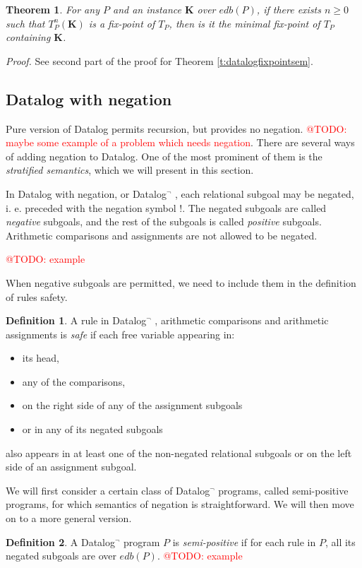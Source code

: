 \documentclass{pracamgr}
\makeatletter
\theoremstyle{plain}
\newtheorem{thm}{Theorem}[section]
\theoremstyle{definition}
\newtheorem{defn}{Definition}[section]
\theoremstyle{remark}
\newcommand{\todo}[1]{\textcolor{red}{@TODO: #1}}
\newcommand{\datalogneg}{Datalog$^{\neg}$ }
\makeatother
\begin{document}
\begin{thm}
For any $P$ and an instance $\textbf{K}$ over $edb(P)$, if there exists $n \ge 0$ such that $T_P^n(\textbf{K})$ is a fix-point of $T_P$, then is it the minimal fix-point of $T_P$ containing $\textbf{K}$.
\end{thm}
\emph{Proof.} See second part of the proof for Theorem \ref{t:datalogfixpointsem}.

\subsection{Datalog with negation}
Pure version of Datalog permits recursion, but provides no negation. \todo{maybe some example of a problem which needs negation}. There are several ways of adding negation to Datalog. One of the most prominent of them is the \emph{stratified semantics}, which we will present in this section. 

In Datalog with negation, or \datalogneg, each relational subgoal may be negated, i. e. preceded with the negation symbol $!$. The negated subgoals are called \emph{negative} subgoals, and the rest of the subgoals is called \emph{positive} subgoals. Arithmetic comparisons and assignments are not allowed to be negated.

\todo{example}

When negative subgoals are permitted, we need to include them in the definition of rules safety. 

\begin{defn}
A rule in \datalogneg, arithmetic comparisons and arithmetic assignments is \emph{safe} if each free variable appearing in:
\begin{itemize}
\item its head,
\item any of the comparisons,
\item on the right side of any of the assignment subgoals
\item or in any of its negated subgoals
\end{itemize}
also appears in at least one of the non-negated relational subgoals or on the left side of an assignment subgoal.
\end{defn}\label{d:datalogeqsaferule}

We will first consider a certain class of \datalogneg programs, called semi-positive programs, for which semantics of negation is straightforward. We will then move on to a more general version.

\begin{defn}
A \datalogneg program $P$ is \emph{semi-positive} if for each rule in $P$, all its negated subgoals are over $edb(P)$.
\todo{example}
\end{defn}
\end{document}
